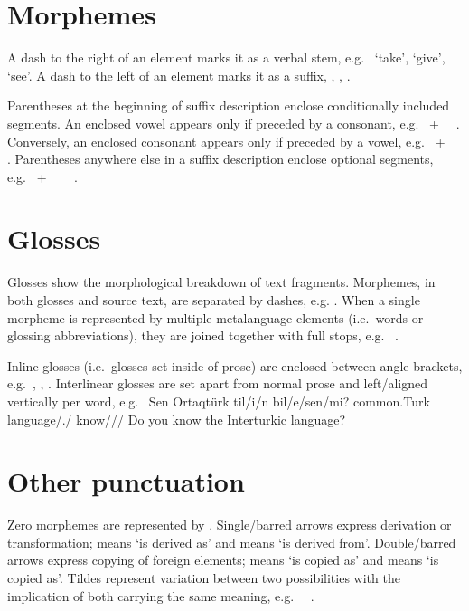 \section*{Morphemes}

A dash to the right of an element marks it as a verbal stem,
e.g.\  `take',  `give', \foreign
{} `see'.
A dash to the left of an element marks it as a suffix,
 , 
\intragls{\Loc},  \intragls{\Cond}.

Parentheses at the beginning of suffix description enclose conditionally
included segments.
An enclosed vowel appears only if preceded by a consonant,
e.g.\  +~ \derivesto~.
Conversely, an enclosed consonant appears only if preceded by a vowel,
e.g.\  +~ \derivesto~%
.
Parentheses anywhere else in a suffix description enclose optional segments,
e.g.\  +~ \derivesto~%
 \altwith~.

\section*{Glosses}

Glosses show the morphological breakdown of text fragments.
Morphemes, in both glosses and source text, are separated by dashes,
e.g.  .
When a single morpheme is represented by multiple metalanguage elements (i.e.\
words or glossing abbreviations), they are joined together with full stops,
e.g.\ \foreign{\latntxt{\=/(s)I}} \intragls{\Poss.\Third}.

Inline glosses (i.e.\ glosses set inside of prose) are enclosed between angle
brackets,
e.g.\ \intragls{\Gen}, \intragls{\Sg}, .
Interlinear glosses are set apart from normal prose and left\-/aligned
vertically per word, e.g.\
\ex
  \intergls
    {Sen Ortaqtürk til\-/i\-/n bil\-/e\-/sen\-/mi?}
    {\Ssg{} common.Turk language\-/\Poss.\Third\-/\Acc{} know\-/\Prs\-/\Ssg\-/%
     \Q}
    {Do you know the Interturkic language?}
\xe

\section*{Other punctuation}

Zero morphemes are represented by \zero.
Single\-/barred arrows express derivation or transformation;
{\derivesto} means `is derived as' and {\derivesfrom} means `is derived from'.
Double\-/barred arrows express copying of foreign elements;
{\copiesto} means `is copied as' and {\copiesfrom} means `is copied as'.
Tildes represent variation between two possibilities with the implication of
both carrying the same meaning,
e.g.\ \phonem{ɔn biɾ} \altwith~\phonet{ɔm biɾ}.